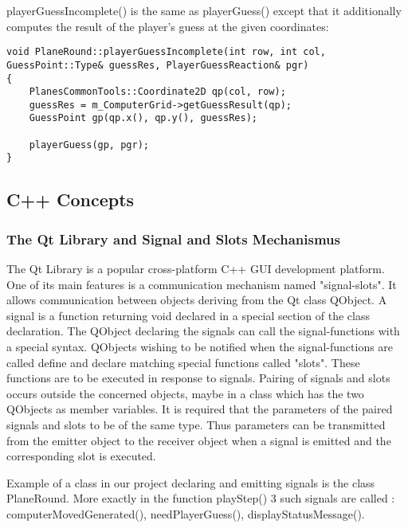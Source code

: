 playerGuessIncomplete() is the same as playerGuess() except that it additionally  computes the result of the player's guess at the given coordinates:

\begin {lstlisting}
void PlaneRound::playerGuessIncomplete(int row, int col, GuessPoint::Type& guessRes, PlayerGuessReaction& pgr)
{
	PlanesCommonTools::Coordinate2D qp(col, row);
	guessRes = m_ComputerGrid->getGuessResult(qp);
	GuessPoint gp(qp.x(), qp.y(), guessRes);
	
	playerGuess(gp, pgr);
}
\end{lstlisting}

\subsection{C++ Concepts}

\subsubsection{The Qt Library and Signal and Slots Mechanismus} \label {Qt_Signals_Slots}

The Qt Library is a popular cross-platform C++ GUI development platform. One of its main features is a communication mechanism named "signal-slots". It allows communication between objects deriving from the Qt class QObject. A signal is a function returning void declared in a special section of the class declaration. The QObject declaring the signals can call the signal-functions with a special syntax. QObjects wishing to be notified when the signal-functions are called define and declare matching special functions called "slots". These functions are to be executed in response to signals. Pairing of signals and slots occurs outside the concerned objects, maybe in a class which has the two QObjects as member variables. It is required that the parameters of the paired signals and slots to be of the same type. Thus parameters can be transmitted from the emitter object to the receiver object when a signal is emitted and the corresponding slot is executed. 

Example of a class in our project declaring and emitting signals is the class PlaneRound. More exactly in the function playStep() 3 such signals are called : computerMovedGenerated(), needPlayerGuess(), displayStatusMessage().

